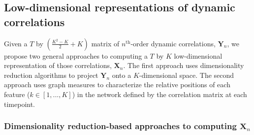 \documentclass[english]{article}
\begin{document}
\subsection*{Low-dimensional representations of dynamic
  correlations}

Given a $T$ by $\left( \frac{K^2 - K}{2} + K \right)$ matrix of
$n^\mathrm{th}$-order dynamic correlations, $\mathbf{Y}_n$, we propose
two general approaches to computing a $T$ by $K$ low-dimensional
representation of those correlations, $\mathbf{X}_n$.  The first
approach uses dimensionality reduction algorithms to project
$\mathbf{Y}_n$ onto a $K$-dimensional space.  The second approach uses
graph measures to characterize the relative positions of each feature
($k \in \left[1, ..., K \right]$) in the network defined by the
correlation matrix at each timepoint.

\subsubsection*{Dimensionality reduction-based approaches to computing
  $\mathbf{X}_n$}
\end{document}
